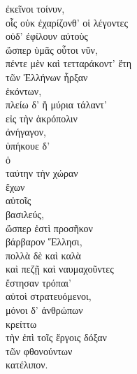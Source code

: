 {\large
\begin{greek}
\noindent ἐκεῖνοι τοίνυν, \\
\tabto{2em} οἷς οὐκ ἐχαρίζονθ' οἱ λέγοντες \\
\tabto{2em} οὐδ' ἐφίλουν αὐτοὺς \\
\tabto{4em} ὥσπερ ὑμᾶς οὗτοι νῦν, \\
πέντε μὲν καὶ τετταράκοντ' ἔτη \\
τῶν Ἑλλήνων ἦρξαν \\
\tabto{2em} ἑκόντων, \\
πλείω δ' ἢ μύρια τάλαντ' \\
\tabto{2em} εἰς τὴν ἀκρόπολιν \\
ἀνήγαγον, \\
ὑπήκουε δ' \\
\tabto{2em} ὁ \\
\tabto{4em} ταύτην τὴν χώραν \\
\tabto{2em} ἔχων \\
αὐτοῖς \\
\tabto{2em} βασιλεύς, \\
ὥσπερ ἐστὶ προσῆκον \\
\tabto{2em} βάρβαρον Ἕλλησι, \\
πολλὰ δὲ καὶ καλὰ \\
\tabto{2em} καὶ πεζῇ καὶ ναυμαχοῦντες \\
ἔστησαν τρόπαι' \\
αὐτοὶ στρατευόμενοι, \\
μόνοι δ' ἀνθρώπων \\
κρείττω \\
τὴν ἐπὶ τοῖς ἔργοις δόξαν \\
\tabto{2em} τῶν φθονούντων \\
κατέλιπον.\\

\end{greek}
}

